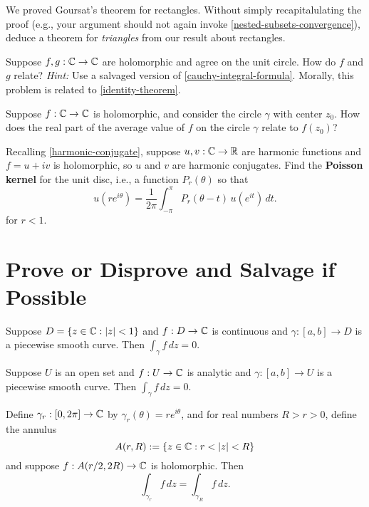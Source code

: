 \documentclass{homework}
\begin{document}
\begin{problem}
  We proved Goursat's theorem for rectangles.  Without simply
  recapitalulating the proof (e.g., your argument should not again
  invoke \ref{nested-subsets-convergence}), deduce a theorem for
  \textit{triangles} from our result about rectangles.
\end{problem}

\begin{problem}
  Suppose $f, g : \mathbb{C} \to \mathbb{C}$ are holomorphic and agree on the unit
  circle.  How do $f$ and $g$ relate?  \textit{Hint:} Use a salvaged
  version of \ref{cauchy-integral-formula}.  Morally, this problem is
  related to \ref{identity-theorem}.
\end{problem}

 \begin{problem}
   Suppose $f : \mathbb{C} \to \mathbb{C}$ is holomorphic, and consider the circle
   $\gamma$ with center $z_0$.  How does the real part of the average
   value of $f$ on the circle $\gamma$ relate to $f(z_0)$?
 \end{problem}

 \begin{problem}
   Recalling \ref{harmonic-conjugate}, suppose $u, v : \mathbb{C} \to \mathbb{R}$ are
   harmonic functions and $f = u + iv$ is holomorphic, so $u$ and $v$
   are harmonic conjugates.  Find the \textbf{Poisson kernel} for the
   unit disc, i.e., a function $P_r(\theta)$ so that
   \[
     u(re^{i\theta })={\frac {1}{2\pi }}\int _{-\pi }^{\pi }P_{r}(\theta -t)\, u(e^{it})\,dt.
   \]
   for $r < 1$.
 \end{problem}

\section{Prove or Disprove and Salvage if Possible}

\begin{problem}
  Suppose $D = \{ z \in \mathbb{C} : \left|z\right| < 1 \}$ and $f : D \to \mathbb{C}$ is
  continuous and $\gamma : [a,b] \to D$ is a piecewise smooth curve.
  Then $\displaystyle\int_\gamma f\, dz = 0$.
\end{problem}
  
\begin{problem}
  Suppose $U$ is an open set and $f : U \to \mathbb{C}$ is analytic and
  $\gamma : [a,b] \to U$ is a piecewise smooth curve.  Then
  $\displaystyle\int_\gamma f\, dz = 0$.
\end{problem}

\begin{problem}
  Define $\gamma_r : [0,2\pi] \to \mathbb{C}$ by
  $\gamma_r(\theta) = r e^{i \theta}$, and for real numbers
  $R > r > 0$, define the annulus
  \[
    A(r,R) := \{ z \in \mathbb{C} : r < |z| < R \}
  \]
  and suppose $f : A(r/2,2R) \to \mathbb{C}$ is holomorphic.  Then
  \[
    \int_{\gamma_r} f \, dz = \int_{\gamma_R} f \, dz.
  \]
\end{problem}
\end{document}
